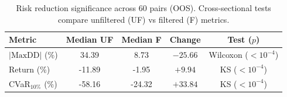 \begin{table}[t]
\centering
\caption{Risk reduction significance across 60 pairs (OOS). Cross-sectional tests compare unfiltered (UF) vs filtered (F) metrics.}
\label{tab:risk_reduction}
\small
\begin{tabular}{lcccc}
\hline
\textbf{Metric} & \textbf{Median UF} & \textbf{Median F} & \textbf{Change} & \textbf{Test ($p$)} \\
\hline
$|\text{MaxDD}|$ (\%) & 34.39 & 8.73 & $-25.66$ & Wilcoxon ($< 10^{-4}$) \\
Return (\%) & -11.89 & -1.95 & $+9.94$ & KS ($< 10^{-4}$) \\
CVaR$_{10\%}$ (\%) & -58.16 & -24.32 & $+33.84$ & KS ($< 10^{-4}$) \\
\hline
\end{tabular}
\end{table}
